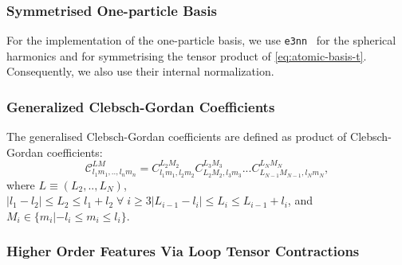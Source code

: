 \documentclass{article}
\begin{document}
\subsubsection{Symmetrised One-particle Basis}
\label{subsec:e3nn}

For the implementation of the one-particle basis, we use \texttt{e3nn}~\cite{e3nnGeiger2022} for the spherical harmonics and for symmetrising the tensor product of \eqref{eq:atomic-basis-t}.
Consequently, we also use their internal normalization.

\subsubsection{Generalized Clebsch-Gordan Coefficients}

The generalised Clebsch-Gordan coefficients are defined as product of Clebsch-Gordan coefficients:
\begin{equation}
  \label{eq:generalized-clebsch-gordan}
  \mathcal{C}^{LM}_{l_{1}m_{1},..,l_{n}m_{n} } = C^{L_{2}M_{2}}_{l_{1}m_{1},l_{2}m_{2}}C^{L_{3}M_{3}}_{L_{2}M_{2},l_{3}m_{3}} ... C^{L_{N}M_{N}}_{L_{N-1}M_{N-1},l_{N}m_{N}},
\end{equation}
where $L \equiv (L_{2},..,L_{N})$,
$|l_{1} - l_{2}| \leq L_{2} \leq l_{1} + l_{2} \; \forall \; i \geq 3 |L_{i-1} - l_{i}| \leq L_{i} \leq L_{i-1} + l_{i}$,
and $M_{i} \in \{m_{i} | -l_{i}\leq m_{i} \leq l_{i}\}$.

\subsubsection{Higher Order Features Via Loop Tensor Contractions}
\label{subsec:tensor_contraction}
\end{document}
